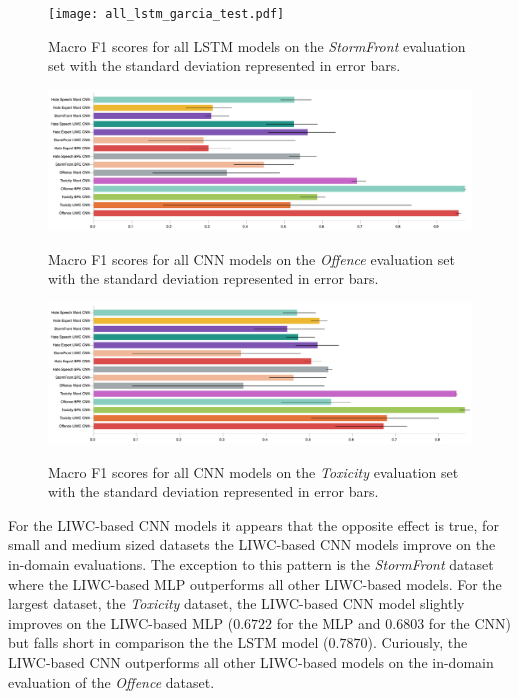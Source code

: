 \begin{figure}
\begin{minipage}{\textwidth}
\centering
  \texttt{[image: all\_lstm\_garcia\_test.pdf]}
  \caption{Macro F1 scores for all LSTM models on the \textit{StormFront} evaluation set with the standard deviation represented in error bars.}
  \label{fig:garcia_lstm_test}
  \vfill
    \includegraphics[width=\textwidth]{all_cnn_davidson_test.pdf}
    \caption{Macro F1 scores for all CNN models on the \textit{Offence} evaluation set with the standard deviation represented in error bars.}
    \label{fig:davidson_cnn_test}
    \vfill
    \includegraphics[width=\textwidth]{all_cnn_wulczyn_test.pdf}
    \caption{Macro F1 scores for all CNN models on the \textit{Toxicity} evaluation set with the standard deviation represented in error bars.}
    \label{fig:wulczyn_cnn_test}
  \end{minipage}
\end{figure}

For the LIWC-based CNN models it appears that the opposite effect is true, for small and medium sized datasets the LIWC-based CNN models improve on the in-domain evaluations. 
The exception to this pattern is the \textit{StormFront} dataset where the LIWC-based MLP outperforms all other LIWC-based models.
For the largest dataset, the \textit{Toxicity} dataset, the LIWC-based CNN model slightly improves on the LIWC-based MLP ($0.6722$ for the MLP and $0.6803$ for the CNN) but falls short in comparison the the LSTM model ($0.7870$).
Curiously, the LIWC-based CNN outperforms all other LIWC-based models on the in-domain evaluation of the \textit{Offence} dataset. 

